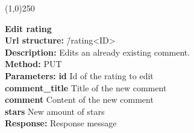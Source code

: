 \documentclass[11pt]{article}
\begin{document}
\begin{center}\line(1,0){250}\end{center}

\begin{tabbing}
\textbf{Edit rating} \\
\textcolor{black!60}{\textbf{Url structure:}} \hspace{0.2in} \= /rating<ID> \\
\textcolor{black!60}{\textbf{Description:}}  \> Edits an already existing comment. \\
\textcolor{black!60}{\textbf{Method:}} \> PUT \\
\textcolor{black!60}{\textbf{Parameters:}} \> \textbf{id} Id of the rating to edit \\
\> \textbf{comment\_title} Title of the new comment \\
\> \textbf{comment} Content of the new comment \\
\> \textbf{stars} New amount of stars \\
\textcolor{black!60}{\textbf{Response:}} \> Response message
\end{tabbing}
\end{document}
